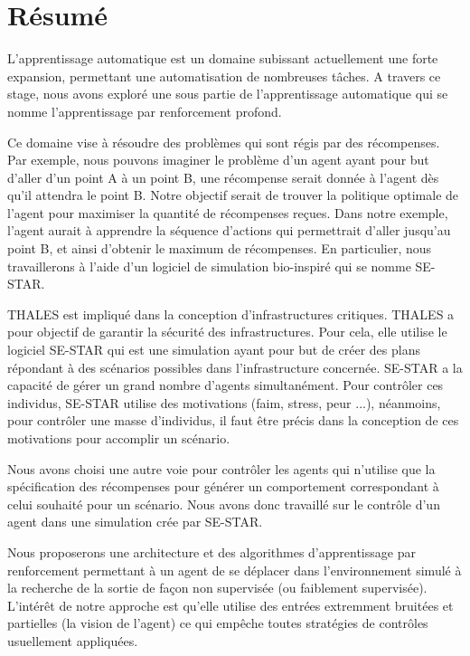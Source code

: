 \newpage


\section*{Résumé}
\bigskip

L'apprentissage automatique est un domaine subissant actuellement une forte expansion, permettant une automatisation de nombreuses tâches. A travers ce stage, nous avons exploré une sous partie de l'apprentissage automatique qui se nomme l'apprentissage par renforcement profond. 

Ce domaine vise à résoudre des problèmes qui sont régis par des récompenses. Par exemple, nous pouvons imaginer le problème d'un agent ayant pour but d'aller d'un point A à un point B, une récompense serait donnée à l'agent dès qu'il attendra le point B. Notre objectif serait de trouver la politique optimale de l'agent pour maximiser la quantité de récompenses reçues. Dans notre exemple, l'agent aurait à apprendre la séquence d'actions qui permettrait d'aller jusqu'au point B, et ainsi d'obtenir le maximum de récompenses. En particulier, nous travaillerons à l'aide d'un logiciel de simulation bio-inspiré qui se nomme SE-STAR. 

THALES est impliqué dans la conception d'infrastructures critiques. THALES a pour objectif de garantir la sécurité des infrastructures. Pour cela, elle utilise le logiciel SE-STAR qui est une simulation ayant pour but de créer des plans répondant à des scénarios possibles dans l'infrastructure concernée. SE-STAR a la capacité de gérer un grand nombre d'agents simultanément. Pour contrôler ces individus, SE-STAR utilise des motivations (faim, stress, peur ...), néanmoins, pour contrôler une masse d'individus, il faut être précis dans la conception de ces motivations pour accomplir un scénario.

Nous avons choisi une autre voie pour contrôler les agents qui n'utilise que la spécification des récompenses pour générer un comportement correspondant à celui souhaité pour un scénario.
Nous avons donc travaillé sur le contrôle d'un agent dans une simulation crée par SE-STAR.

Nous proposerons une architecture et des algorithmes d'apprentissage par renforcement permettant à un agent de se déplacer dans l'environnement simulé à la recherche de la sortie de façon non supervisée (ou faiblement supervisée). L'intérêt de notre approche est qu'elle utilise des entrées extremment bruitées et partielles (la vision de l'agent) ce qui empêche toutes stratégies de contrôles usuellement appliquées.

